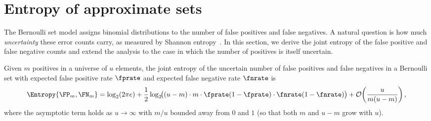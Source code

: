 \section{Entropy of approximate sets}
\label{sec:entropy}
The Bernoulli set model assigns binomial distributions to the number of false
positives and false negatives.
A natural question is how much \emph{uncertainty} these error counts carry,
as measured by Shannon entropy~\cite{shannonBSC}.
In this section, we derive the joint entropy of the false positive and false
negative counts and extend the analysis to the case in which the number of
positives is itself uncertain.

\begin{theorem}
\label{thm:joint_entropy_fp_fn}
Given $m$ positives in a universe of $u$ elements, the joint entropy of the
uncertain number of false positives and false negatives in a Bernoulli set with
expected false positive rate $\fprate$ and expected false negative rate $\fnrate$
is
\begin{equation}
\label{eq:joint_entropy}
    \Entropy{\FP_m, \FN_m}
    = \log_2(2\pi e)
    + \frac{1}{2}\log_2\!\bigl(
        (u - m) \cdot m \cdot \fprate(1-\fprate) \cdot \fnrate(1-\fnrate)
      \bigr)
    + \mathcal{O}\!\left(\frac{u}{m(u-m)}\right),
\end{equation}
where the asymptotic term holds as $u \to \infty$ with $m/u$ bounded away
from $0$ and $1$ (so that both $m$ and $u - m$ grow with $u$).
\end{theorem}
